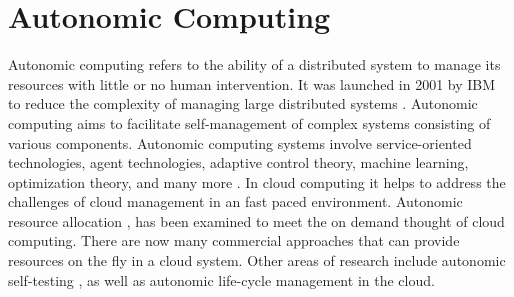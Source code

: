 \section{Autonomic Computing}
Autonomic computing refers to the ability of a distributed system to manage its resources with little or no human intervention. It was launched in 2001 by IBM to reduce the complexity of managing large distributed systems  \cite{horn2001autonomic}. Autonomic computing aims to facilitate self-management of complex systems consisting of various components. Autonomic computing systems involve service-oriented technologies, agent technologies, adaptive control theory, machine learning, optimization theory, and many more  \citep{fei2005design}  \citep{zhao2009survey}. In cloud computing it helps to address the challenges of cloud management in an fast paced environment. Autonomic resource allocation  \cite{inproceedingshu2009},  \cite{Casalicchio:2013:ARP:2494621.2494623} has been examined to meet the on demand thought of cloud computing. There are now many commercial approaches that can provide resources on the fly in a cloud system.
Other areas of research include autonomic self-testing  \cite{5463688}, as well as autonomic life-cycle management  \cite{brandic2009towards} in the cloud.

